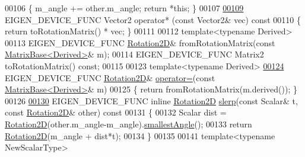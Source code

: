 \begin{DoxyCode}
00106   \{ m\_angle += other.m\_angle; \textcolor{keywordflow}{return} *\textcolor{keyword}{this}; \}
00107 
\hyperlink{group___geometry___module_a6650136f5839cfd028fd7f1373d06882}{00109}   EIGEN\_DEVICE\_FUNC Vector2 operator* (\textcolor{keyword}{const} Vector2& vec)\textcolor{keyword}{ const}
00110 \textcolor{keyword}{  }\{ \textcolor{keywordflow}{return} toRotationMatrix() * vec; \}
00111   
00112   \textcolor{keyword}{template}<\textcolor{keyword}{typename} Derived>
00113   EIGEN\_DEVICE\_FUNC \hyperlink{group___geometry___module_class_eigen_1_1_rotation2_d}{Rotation2D}& fromRotationMatrix(\textcolor{keyword}{const} 
      \hyperlink{group___core___module_class_eigen_1_1_matrix_base}{MatrixBase<Derived>}& m);
00114   EIGEN\_DEVICE\_FUNC Matrix2 toRotationMatrix() \textcolor{keyword}{const};
00115 
00123   \textcolor{keyword}{template}<\textcolor{keyword}{typename} Derived>
\hyperlink{group___geometry___module_a483efa61d85a46bb94912a68cfee9902}{00124}   EIGEN\_DEVICE\_FUNC \hyperlink{group___geometry___module_class_eigen_1_1_rotation2_d}{Rotation2D}& \hyperlink{group___geometry___module_a483efa61d85a46bb94912a68cfee9902}{operator=}(\textcolor{keyword}{const}  
      \hyperlink{group___core___module_class_eigen_1_1_matrix_base}{MatrixBase<Derived>}& m)
00125   \{ \textcolor{keywordflow}{return} fromRotationMatrix(m.derived()); \}
00126 
\hyperlink{group___geometry___module_a47058d6327b801f6987506dcfbffb77f}{00130}   EIGEN\_DEVICE\_FUNC \textcolor{keyword}{inline} \hyperlink{group___geometry___module_class_eigen_1_1_rotation2_d}{Rotation2D} \hyperlink{group___geometry___module_a47058d6327b801f6987506dcfbffb77f}{slerp}(\textcolor{keyword}{const} Scalar& t, \textcolor{keyword}{const} 
      \hyperlink{group___geometry___module_class_eigen_1_1_rotation2_d}{Rotation2D}& other)\textcolor{keyword}{ const}
00131 \textcolor{keyword}{  }\{
00132     Scalar dist = \hyperlink{group___geometry___module_class_eigen_1_1_rotation2_d}{Rotation2D}(other.m\_angle-m\_angle).\hyperlink{group___geometry___module_a38e64a85197dc268a3e7832e75e469c7}{smallestAngle}();
00133     \textcolor{keywordflow}{return} \hyperlink{group___geometry___module_class_eigen_1_1_rotation2_d}{Rotation2D}(m\_angle + dist*t);
00134   \}
00135 
00141   \textcolor{keyword}{template}<\textcolor{keyword}{typename} NewScalarType>

\end{DoxyCode}
